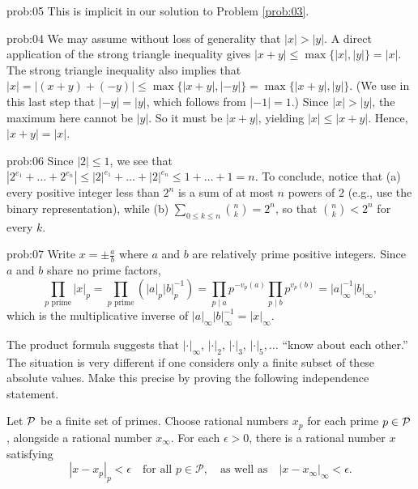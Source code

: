 \begin{sol}{prob:05} This is implicit in our solution to Problem \ref{prob:03}.
\end{sol}

\begin{sol}{prob:04} We may assume without loss of generality that $|x| > |y|$. A direct application of the strong triangle inequality gives $|x+y| \le \max\{|x|,|y|\} = |x|$. The strong triangle inequality also implies that $|x| = |(x+y) + (-y)| \le \max\{|x+y|,|-y|\} = \max\{|x+y|,|y|\}$. (We use in this last step that $|-y| = |y|$, which follows from $|-1|=1$.) Since $|x| > |y|$, the maximum here cannot be $|y|$. So it must be $|x+y|$, yielding $|x| \le |x+y|$. Hence, $|x+y| = |x|$.  
\end{sol}


\begin{sol}{prob:06} Since $|2| \le 1$, we see that $|2^{e_1} + \dots + 2^{e_n}| \le  |2|^{e_1} + \dots + |2|^{e_n} \le 1  +\dots + 1 = n$.
To conclude, notice that (a) every positive integer less than $2^n$ is a sum of at most $n$ powers of $2$ (e.g., use the binary representation), while (b) $\sum_{0 \le k \le n} \binom{n}{k}=2^n$, so that $\binom{n}{k} < 2^n$ for every $k$.
\end{sol}

\begin{sol}{prob:07} Write $x = \pm \frac{a}{b}$ where $a$ and $b$ are relatively prime positive integers. Since $a$ and $b$ share no prime factors,
\[ \prod_{p\text{ prime}} |x|_p = \prod_{p \text{ prime}} \left(|a|_p |b|_p^{-1}\right) = \prod_{p\mid a} p^{-v_p(a)} \prod_{p \mid b} p^{v_p(b)} = |a|_{\infty}^{-1} |b|_{\infty},\]
which is the multiplicative inverse of $|a|_{\infty} |b|_{\infty}^{-1} = |x|_{\infty}$.
\end{sol}

\begin{challenge} The product formula suggests that $|\cdot|_{\infty}$, $|\cdot|_2$, $|\cdot|_3$, $|\cdot|_5, \dots$ ``know about each other.'' The situation is very different if one considers only a finite subset of these absolute values. Make this precise by proving the following independence statement.

Let $\mathcal{P}$ be a finite set of primes. Choose rational numbers $x_p$ for each prime $p\in \mathcal{P}$, alongside a rational number $x_{\infty}$. For each $\epsilon > 0$, there is a rational number $x$ satisfying 
\[ |x - x_p|_p < \epsilon\quad\text{for all $p \in \mathcal{P}$}, \quad\text{as well as}\quad |x-x_{\infty}|_{\infty} <\epsilon. \]
\end{challenge}

